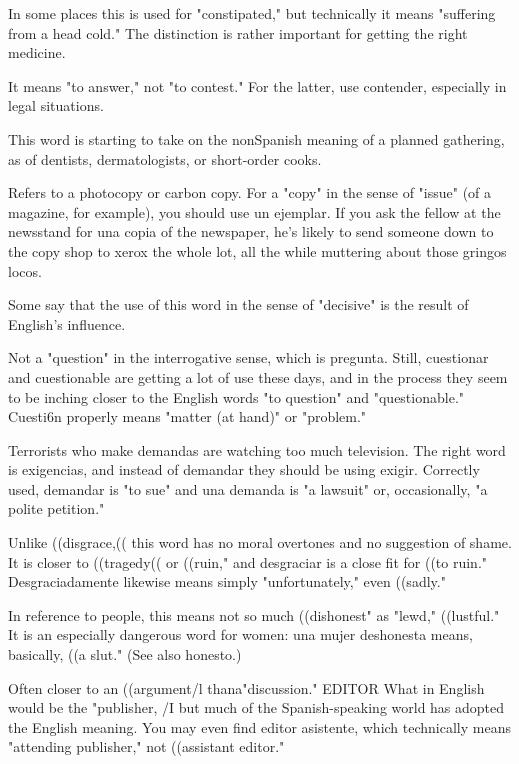  In some places this is used for "constipated,"
but technically it means "suffering from a head cold." The distinction
is rather important for getting the right medicine.

 It means "to answer," not "to contest." For the
latter, use contender, especially in legal situations.

 This word is starting to take on the nonSpanish meaning of a planned gathering, as of dentists, dermatologists, or short-order cooks.

 Refers to a photocopy or carbon copy. For a "copy" in
the sense of "issue" (of a magazine, for example), you should use un
ejemplar. If you ask the fellow at the newsstand for una copia of the
newspaper, he's likely to send someone down to the copy shop to
xerox the whole lot, all the while muttering about those gringos
locos.

 Some say that the use of this word in the sense of
"decisive" is the result of English's influence.

 Not a "question" in the interrogative sense,
which is pregunta. Still, cuestionar and cuestionable are getting a
lot of use these days, and in the process they seem to be inching closer
to the English words "to question" and "questionable." Cuesti6n properly means "matter (at hand)" or "problem."

 Terrorists who make demandas are watching
too much television. The right word is exigencias, and instead of
demandar they should be using exigir. Correctly used, demandar is
"to sue" and una demanda is "a lawsuit" or, occasionally, "a polite
petition."

 Unlike ((disgrace,(( this word has no moral overtones and no suggestion of shame. It is closer to ((tragedy(( or ((ruin,"
and desgraciar is a close fit for ((to ruin." Desgraciadamente likewise
means simply "unfortunately," even ((sadly."

 In reference to people, this means not so
much ((dishonest" as "lewd," ((lustful." It is an especially dangerous
word for women: una mujer deshonesta means, basically, ((a slut."
(See also honesto.)

 Often closer to an ((argument/l thana"discussion."
EDITOR What in English would be the "publisher, /I but much
of the Spanish-speaking world has adopted the English meaning. You
may even find editor asistente, which technically means "attending
publisher," not ((assistant editor."

